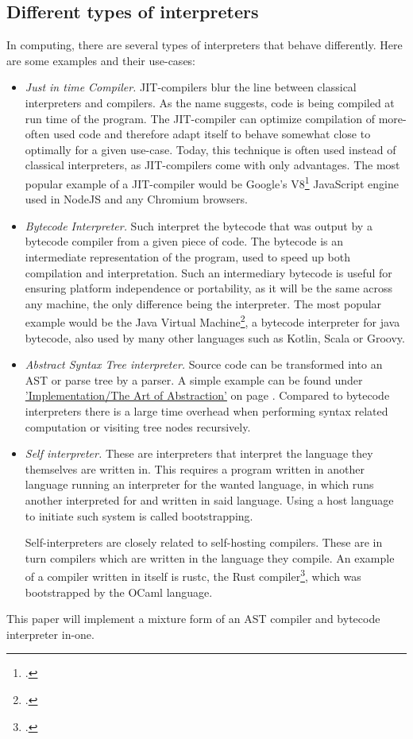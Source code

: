 \documentclass[12pt,a4paper,man]{apa7}
\begin{document}
\subsection{Different types of interpreters}
In computing, there are several types of interpreters that behave differently.
Here are some examples and their use-cases:
\begin{itemize}
    \item \emph{Just in time Compiler.} JIT-compilers blur the line between
        classical interpreters and compilers. As the name suggests, code is
        being compiled at run time of the program. The JIT-compiler can optimize
        compilation of more-often used code and therefore adapt itself to
        behave somewhat close to optimally for a given use-case. Today, this 
        technique is often used instead of classical interpreters, as
        JIT-compilers come with only advantages. The most popular example of
        a JIT-compiler would be Google's V8\footcite{V8} JavaScript engine used
        in NodeJS and any Chromium browsers.
    \item \emph{Bytecode Interpreter.} Such interpret the bytecode that was
        output by a bytecode compiler from a given piece of code. The bytecode
        is an intermediate representation of the program, used to speed up
        both compilation and interpretation. Such an intermediary bytecode is
        useful for ensuring platform independence or portability, as it will be
        the same across any machine, the only difference being the interpreter.
        The most popular example would be the Java Virtual Machine\footcite{jvm},
        a bytecode interpreter for java bytecode, also used by many other languages
        such as Kotlin, Scala or Groovy.
    \item \emph{Abstract Syntax Tree interpreter.} Source code can be
        transformed into an AST or parse tree by a parser. A simple example
        can be found under 
        \hyperref[simple interpreter]{'Implementation/The Art of Abstraction'}
        on page \pageref{simple interpreter}. Compared to bytecode interpreters
        there is a large time overhead when performing syntax related computation
        or visiting tree nodes recursively.
    \item \emph{Self interpreter.} These are interpreters that interpret the
        language they themselves are written in. This requires a program
        written in another language running an interpreter for the wanted
        language, in which runs another interpreted for and written in said
        language. Using a host language to initiate such system is called
        bootstrapping.

        Self-interpreters are closely related to self-hosting compilers. These
        are in turn compilers which are written in the language they compile.
        An example of a compiler written in itself is rustc, the Rust
        compiler\footcite{rustc}, which was bootstrapped by the OCaml language.
\end{itemize}
This paper will implement a mixture form of an AST compiler and bytecode
interpreter in-one.
\end{document}
